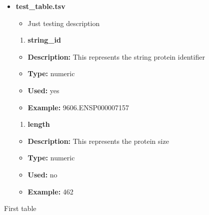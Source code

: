 \begin{itemize}
\tightlist
\item
  \textbf{test\_table.tsv}

  \begin{itemize}
  \tightlist
  \item
    Just testing description
  \end{itemize}

  \begin{enumerate}
  \def\labelenumi{\arabic{enumi}.}
  \tightlist
  \item
    \textbf{string\_id}
  \end{enumerate}

  \begin{itemize}
  \tightlist
  \item
    \textbf{Description:} This represents the string protein identifier
  \item
    \textbf{Type:} numeric
  \item
    \textbf{Used:} yes
  \item
    \textbf{Example:} 9606.ENSP000007157
  \end{itemize}

  \begin{enumerate}
  \def\labelenumi{\arabic{enumi}.}
  \setcounter{enumi}{1}
  \tightlist
  \item
    \textbf{length}
  \end{enumerate}

  \begin{itemize}
  \tightlist
  \item
    \textbf{Description:} This represents the protein size
  \item
    \textbf{Type:} numeric
  \item
    \textbf{Used:} no
  \item
    \textbf{Example:} 462
  \end{itemize}
\end{itemize}

First table

